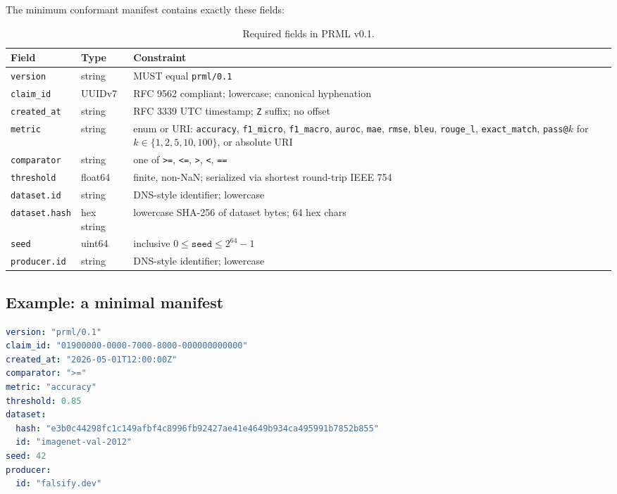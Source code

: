 \documentclass[11pt, a4paper]{article}
\begin{document}
The minimum conformant manifest contains exactly these fields:

\begin{table}[h]
\centering
\small
\begin{tabular}{@{}p{3.0cm} p{2.0cm} p{8.5cm}@{}}
\toprule
Field & Type & Constraint \\
\midrule
\texttt{version} & string & MUST equal \texttt{prml/0.1} \\
\texttt{claim\_id} & UUIDv7~\cite{rfc9562} & RFC 9562 compliant; lowercase; canonical hyphenation \\
\texttt{created\_at} & string & RFC 3339 UTC timestamp; \texttt{Z} suffix; no offset \\
\texttt{metric} & string & enum or URI: \texttt{accuracy}, \texttt{f1\_micro}, \texttt{f1\_macro}, \texttt{auroc}, \texttt{mae}, \texttt{rmse}, \texttt{bleu}, \texttt{rouge\_l}, \texttt{exact\_match}, \texttt{pass@}$k$ for $k \in \{1,2,5,10,100\}$, or absolute URI \\
\texttt{comparator} & string & one of \texttt{>=}, \texttt{<=}, \texttt{>}, \texttt{<}, \texttt{==} \\
\texttt{threshold} & float64 & finite, non-NaN; serialized via shortest round-trip IEEE 754 \\
\texttt{dataset.id} & string & DNS-style identifier; lowercase \\
\texttt{dataset.hash} & hex string & lowercase SHA-256 of dataset bytes; 64 hex chars \\
\texttt{seed} & uint64 & inclusive $0 \leq \texttt{seed} \leq 2^{64}-1$ \\
\texttt{producer.id} & string & DNS-style identifier; lowercase \\
\bottomrule
\end{tabular}
\caption{Required fields in PRML v0.1.}
\label{tab:required-fields}
\end{table}

\subsection{Example: a minimal manifest}

\begin{lstlisting}[language=yaml, caption={Minimal PRML v0.1 manifest, eight required fields, canonical form.}]
version: "prml/0.1"
claim_id: "01900000-0000-7000-8000-000000000000"
created_at: "2026-05-01T12:00:00Z"
comparator: ">="
metric: "accuracy"
threshold: 0.85
dataset:
  hash: "e3b0c44298fc1c149afbf4c8996fb92427ae41e4649b934ca495991b7852b855"
  id: "imagenet-val-2012"
seed: 42
producer:
  id: "falsify.dev"
\end{lstlisting}
\end{document}
